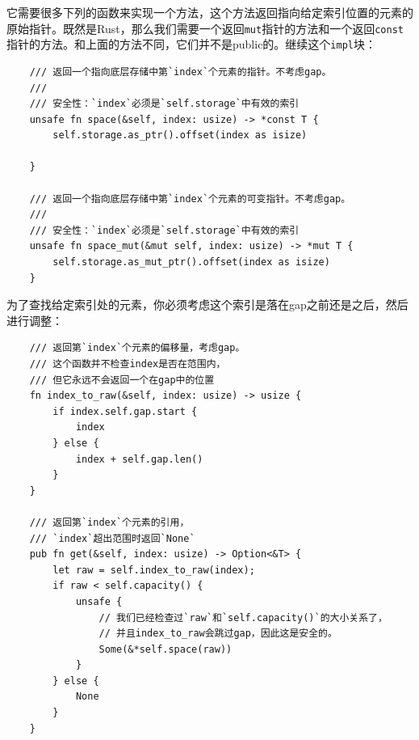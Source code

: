 它需要很多下列的函数来实现一个方法，这个方法返回指向给定索引位置的元素的原始指针。既然是Rust，那么我们需要一个返回\texttt{mut}指针的方法和一个返回\texttt{const}指针的方法。和上面的方法不同，它们并不是public的。继续这个\texttt{impl}块：
\begin{verbatim}
    /// 返回一个指向底层存储中第`index`个元素的指针。不考虑gap。
    ///
    /// 安全性：`index`必须是`self.storage`中有效的索引
    unsafe fn space(&self, index: usize) -> *const T {
        self.storage.as_ptr().offset(index as isize)
    
    }

    /// 返回一个指向底层存储中第`index`个元素的可变指针。不考虑gap。
    ///
    /// 安全性：`index`必须是`self.storage`中有效的索引
    unsafe fn space_mut(&mut self, index: usize) -> *mut T {
        self.storage.as_mut_ptr().offset(index as isize)
    }
\end{verbatim}

为了查找给定索引处的元素，你必须考虑这个索引是落在gap之前还是之后，然后进行调整：
\begin{verbatim}
    /// 返回第`index`个元素的偏移量，考虑gap。
    /// 这个函数并不检查index是否在范围内，
    /// 但它永远不会返回一个在gap中的位置
    fn index_to_raw(&self, index: usize) -> usize {
        if index.self.gap.start {
            index
        } else {
            index + self.gap.len()
        }
    }

    /// 返回第`index`个元素的引用，
    /// `index`超出范围时返回`None`
    pub fn get(&self, index: usize) -> Option<&T> {
        let raw = self.index_to_raw(index);
        if raw < self.capacity() {
            unsafe {
                // 我们已经检查过`raw`和`self.capacity()`的大小关系了，
                // 并且index_to_raw会跳过gap，因此这是安全的。
                Some(&*self.space(raw))
            }
        } else {
            None
        }
    }
\end{verbatim}

